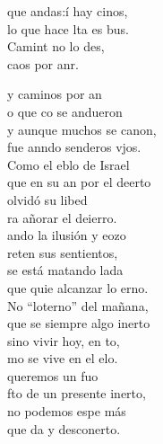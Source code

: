 \begin{cancion}%
	\begin{chorus}%
	 que andas:í hay cinos,  \\
	lo que hace lta es bus.\\
	Camint no lo des,\\
	 caos por anr.\\
	\end{chorus}%
	y caminos por an \\
	o que co se andueron\\
	y aunque muchos se canon, \\
	fue anndo senderos vjos.\\
	Como el eblo de Israel \\
	que en su an por el deerto\\
	olvidó su libed \\
	ra añorar el deierro.\\
	ando la ilusión y eozo \\
	reten sus sentientos,\\
	se está matando lada\\
	que quie alcanzar lo erno.\\
	No “loterno” del mañana, \\
	que se siempre algo inerto\\
	sino vivir hoy, en to, \\
	mo se vive en el elo. \\
	 queremos un fuo \\
	fto de un presente inerto,\\
	no podemos espe más \\
	que da y desconerto.\\

\end{cancion}
